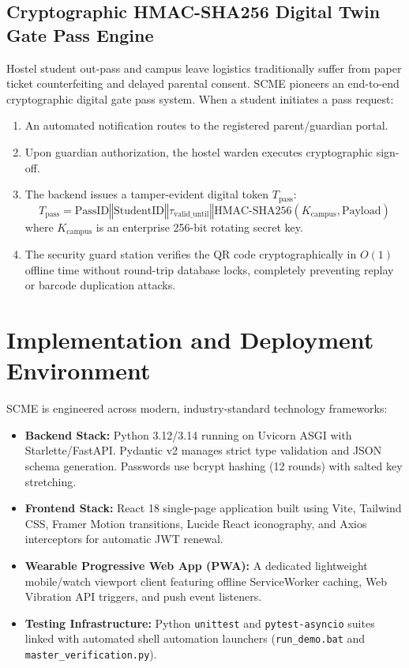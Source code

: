 \documentclass[11pt,a4paper]{article}
\begin{document}
\subsection{Cryptographic HMAC-SHA256 Digital Twin Gate Pass Engine}
Hostel student out-pass and campus leave logistics traditionally suffer from paper ticket counterfeiting and delayed parental consent. SCME pioneers an end-to-end cryptographic digital gate pass system. When a student initiates a pass request:
\begin{enumerate}
    \item An automated notification routes to the registered parent/guardian portal.
    \item Upon guardian authorization, the hostel warden executes cryptographic sign-off.
    \item The backend issues a tamper-evident digital token $T_{\text{pass}}$:
    \begin{equation}
        T_{\text{pass}} = \text{PassID} \mathbin{\Vert} \text{StudentID} \mathbin{\Vert} \tau_{\text{valid\_until}} \mathbin{\Vert} \text{HMAC-SHA256}(K_{\text{campus}}, \text{Payload})
        \label{eq:hmac}
    \end{equation}
    where $K_{\text{campus}}$ is an enterprise 256-bit rotating secret key.
    \item The security guard station verifies the QR code cryptographically in $O(1)$ offline time without round-trip database locks, completely preventing replay or barcode duplication attacks.
\end{enumerate}

\section{Implementation and Deployment Environment}
\label{sec:implementation}

SCME is engineered across modern, industry-standard technology frameworks:
\begin{itemize}
    \item \textbf{Backend Stack:} Python 3.12/3.14 running on Uvicorn ASGI with Starlette/FastAPI. Pydantic v2 manages strict type validation and JSON schema generation. Passwords use bcrypt hashing (12 rounds) with salted key stretching.
    \item \textbf{Frontend Stack:} React 18 single-page application built using Vite, Tailwind CSS, Framer Motion transitions, Lucide React iconography, and Axios interceptors for automatic JWT renewal.
    \item \textbf{Wearable Progressive Web App (PWA):} A dedicated lightweight mobile/watch viewport client featuring offline ServiceWorker caching, Web Vibration API triggers, and push event listeners.
    \item \textbf{Testing Infrastructure:} Python \texttt{unittest} and \texttt{pytest-asyncio} suites linked with automated shell automation launchers (\texttt{run\_demo.bat} and \texttt{master\_verification.py}).
\end{itemize}
\end{document}
